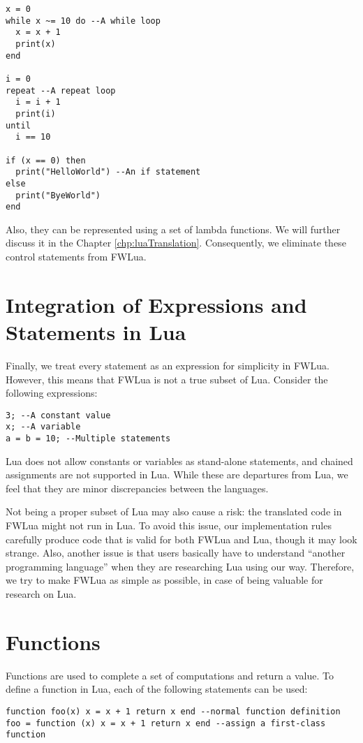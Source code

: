 \newpage
\begin{verbatim}
x = 0
while x ~= 10 do --A while loop
  x = x + 1
  print(x)
end

i = 0
repeat --A repeat loop
  i = i + 1
  print(i)
until
  i == 10

if (x == 0) then 
  print("HelloWorld") --An if statement
else 
  print("ByeWorld")
end
\end{verbatim}

Also, they can be represented using a set of lambda functions. We will further discuss it in the Chapter \ref{chp:luaTranslation}. Consequently, we eliminate these control statements from FWLua.

\section{Integration of Expressions and Statements in Lua}
Finally, we treat every statement as an expression for simplicity in FWLua. However, this means that FWLua is not a true subset of Lua. Consider the following expressions:

\begin{verbatim}
3; --A constant value
x; --A variable
a = b = 10; --Multiple statements
\end{verbatim}

Lua does not allow constants or variables as stand-alone statements, and chained assignments are not supported in Lua. While these are departures from Lua, we feel that they are minor discrepancies between the languages.

Not being a proper subset of Lua may also cause a risk: the translated code in FWLua might not run in Lua. To avoid this issue,  our implementation rules carefully produce code that is valid for both FWLua and Lua, though it may look strange.
Also,  another issue is that users basically have to understand ``another programming language'' when they are researching Lua using our way. Therefore, we try to make FWLua as simple as possible, in case of being valuable for research on Lua.

\section{Functions}
Functions are used to complete a set of computations and return a value. To define a function in Lua, each of the following statements can be used:

\begin{verbatim}
function foo(x) x = x + 1 return x end --normal function definition
foo = function (x) x = x + 1 return x end --assign a first-class function
\end{verbatim}

